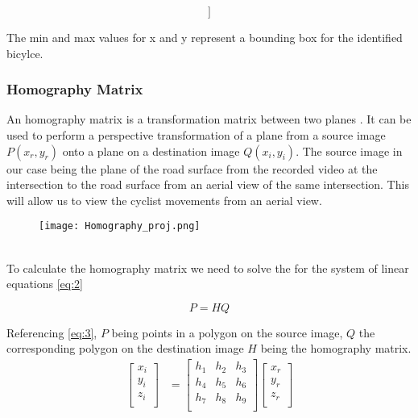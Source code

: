 \begin{equation}
  [ [frame id][xmin][ymin][xmax][ymax][confidence]]\label{representation}
\end{equation}

The min and max values for x and y represent a bounding box for the identified bicylce.

\subsubsection{Homography Matrix}

An homography matrix is a transformation matrix between two planes \cite{hartley_zisserman_2004}. It can be used to perform a perspective transformation of a plane from a source image $P(x_r, y_r)$ onto a plane on a destination image $Q(x_i, y_i)$.
The source image in our case being the plane of the road surface from the recorded video at the intersection to the road surface from an aerial view of the same intersection.  
This will allow us to view the cyclist movements from an aerial view.
\ \\ 
\begin{figure}[h]
  \texttt{[image: Homography\_proj.png]}
  \centering 
  \end{figure}
  \label{homography}
\ \\ 
To calculate the homography matrix we need to solve the for the system of linear equations \ref{eq:2}

\begin{equation}
  P = HQ\label{eq:2}
\end{equation} 

Referencing \ref{eq:3}, $P$ being points in a polygon on the source image, $Q$ the corresponding polygon on the destination image $H$ being the homography matrix.
\begin{align}
\label{eq:3}
  \begin{bmatrix}
    x_{i} \\
    y_{i} \\
    z_{i} \\
  \end{bmatrix}
  &= \begin{bmatrix}
      h_1 & h_2 & h_3 \\
      h_4 & h_5 & h_6 \\
      h_7 & h_8 & h_9 \\
  \end{bmatrix}
  \begin{bmatrix}
    x_{r} \\
    y_{r} \\
    z_{r} \\
  \end{bmatrix}
\end{align}

